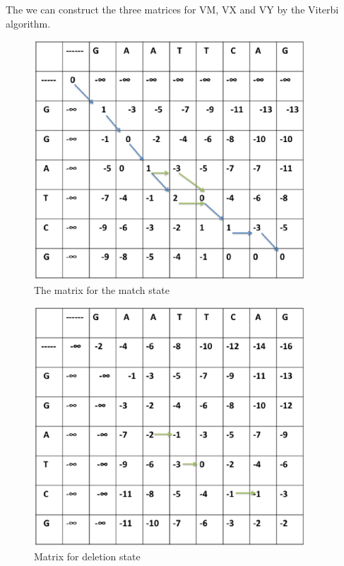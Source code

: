 \documentclass[english, a4paper,11pt]{article}
\begin{document}
The we can construct the three matrices for VM, VX and VY by the Viterbi
algorithm.

\begin{figure}
\begin{centering}
\includegraphics[width=4in]{Slide1}\caption{The matrix for the match state}
\par\end{centering}
\end{figure}

\begin{figure}
\begin{centering}
\includegraphics[width=4in]{Slide2}
\par\end{centering}
\caption{Matrix for deletion state}
\end{figure}
\end{document}
